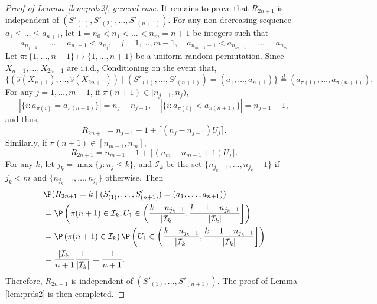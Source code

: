 \begin{proof}[Proof of Lemma~\ref{lem:prds2}, general case]
It remains to prove that $R_{2n+1}$ is independent of $(S'_{(1)}, S'_{(2)}, \ldots, S'_{(n+1)})$. For any non-decreasing sequence $a_{1}\le \ldots\le a_{n+1}$, let $1 = n_0 < n_1 < \ldots < n_m = n+1$ be integers such that
\[a_{n_{j-1}} = \ldots = a_{n_j - 1} < a_{n_j}, \quad j = 1,\ldots, m - 1, \quad a_{n_{m-1}-1} < a_{n_{m-1}} = \ldots = a_{n_{m}}\]
Let $\pi: \{1, \ldots, n+1\}\mapsto \{1, \ldots, n + 1\}$ be a uniform random permutation. Since $X_{n+1}, \ldots, X_{2n+1}$ are i.i.d.,  Conditioning on the event that,
\[\bigg\{\left(\hat{s}(X_{n+1}), \ldots, \hat{s}(X_{2n+1})\right)\mid (S'_{(1)}, \ldots, S'_{(n+1)}) = (a_1, \ldots, a_{n+1})\bigg\}\stackrel{d}{=}\left(a_{\pi(1)}, \ldots, a_{\pi(n+1)}\right).\]
For any $j = 1,\ldots, m - 1$, if $\pi(n+1)\in [n_{j-1}, n_{j})$,
\[|\{i: a_{\pi(i)} = a_{\pi(n+1)}\}| = n_{j} - n_{j-1}, \quad |\{i: a_{\pi(i)} < a_{\pi(n+1)}\}| = n_{j-1} - 1,\]
and thus,
\[R_{2n+1} = n_{j-1} - 1 + \lceil (n_{j} - n_{j-1})U_{j}\rceil.\]
Similarly, if $\pi(n+1)\in [n_{m-1}, n_{m}]$,
\[R_{2n+1} = n_{m-1} - 1 + \lceil (n_{m} - n_{m-1} + 1)U_{j}\rceil.\]
For any $k$, let $j_k = \max\{j: n_{j}\le k\}$, and $\mathcal{I}_k$ be the set $\{n_{j_k - 1}, \ldots, n_{j_k} - 1\}$ if $j_k < m$ and $\{n_{j_k - 1}, \ldots, n_{j_k}\}$ otherwise. Then
\begin{align*}
&\P(R_{2n+1} = k\mid (S'_{(1)}, \ldots, S'_{(n+1)}) = (a_1, \ldots, a_{n+1}))\\
& = \P\left(\pi(n+1)\in \mathcal{I}_{k}, U_{1}\in \left(\frac{k - n_{j_k - 1}}{|\mathcal{I}_k|}, \frac{k + 1 - n_{j_k - 1}}{|\mathcal{I}_k|} \right]\right)\\
& = \P\left(\pi(n+1)\in \mathcal{I}_{k}\right)\P\left(U_{1}\in \left(\frac{k  - n_{j_k - 1}}{|\mathcal{I}_{k}|}, \frac{k + 1 - n_{j_k - 1}}{|\mathcal{I}_{k}|} \right]\right)\\
& = \frac{|\mathcal{I}_{k}|}{n+1} \frac{1}{|\mathcal{I}_{k}|} = \frac{1}{n+1}.
\end{align*}
Therefore, $R_{2n+1}$ is independent of $(S'_{(1)}, \ldots, S'_{(n+1)})$. The proof of Lemma \ref{lem:prds2} is then completed.
\end{proof}



